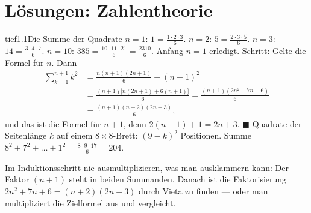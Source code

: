 \chapter{Lösungen: Zahlentheorie}

\begin{loesungkarte}{tief}{1.1}{Die Summe der Quadrate}
$n = 1$: $1 = \frac{1\cdot2\cdot3}6$. $n = 2$: $5 = \frac{2\cdot3\cdot5}6$. $n = 3$: $14 = \frac{3\cdot4\cdot7}6$. $n = 10$: $385 = \frac{10\cdot11\cdot21}6 = \frac{2310}6$. \checkmark
{}
Anfang $n = 1$ erledigt. Schritt: Gelte die Formel für $n$. Dann
\begin{align*} \sum_{k=1}^{n+1}k^{2} &= \frac{n(n+1)(2n+1)}6 + (n+1)^{2}\\ &= \frac{(n+1)\bigl[n(2n+1) + 6(n+1)\bigr]}6 = \frac{(n+1)(2n^{2} + 7n + 6)}6\\ &= \frac{(n+1)(n+2)(2n+3)}6, \end{align*}
und das ist die Formel für $n + 1$, denn $2(n+1) + 1 = 2n + 3$. $\blacksquare$
Quadrate der Seitenlänge $k$ auf einem $8\times8$-Brett: $(9 - k)^{2}$ Positionen. Summe $8^{2} + 7^{2} + \dots + 1^{2} = \frac{8\cdot9\cdot17}6 = 204$.
\begin{mitnehmen}\kastentext
Im Induktionsschritt nie ausmultiplizieren, was man ausklammern kann: Der Faktor $(n + 1)$ steht in beiden Summanden. Danach ist die Faktorisierung $2n^{2} + 7n + 6 = (n + 2)(2n + 3)$ durch Vieta zu finden --- oder man multipliziert die Zielformel aus und vergleicht.
\end{mitnehmen}
\end{loesungkarte}

